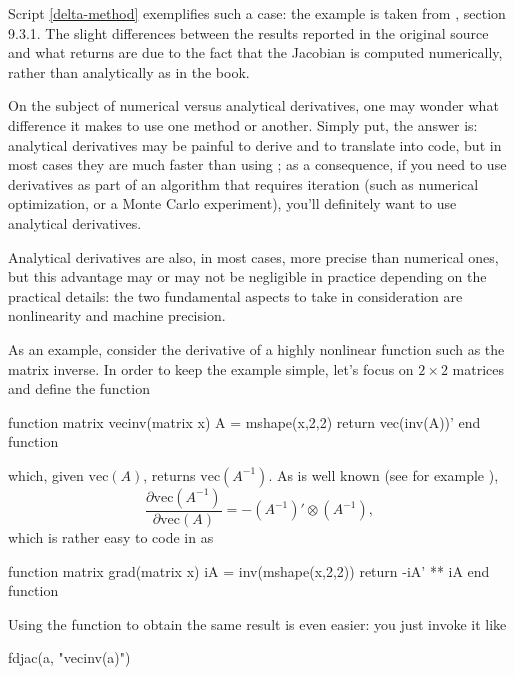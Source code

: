 Script \ref{delta-method} exemplifies such a case: the example is
taken from \cite{greene03}, section 9.3.1. The slight differences
between the results reported in the original source and what
 returns are due to the fact that the Jacobian is computed
numerically, rather than analytically as in the book.

On the subject of numerical versus analytical derivatives, one may
wonder what difference it makes to use one method or another. Simply
put, the answer is: analytical derivatives may be painful to derive
and to translate into code, but in most cases they are much faster
than using ; as a consequence, if you need to use
derivatives as part of an algorithm that requires iteration (such as
numerical optimization, or a Monte Carlo experiment), you'll
definitely want to use analytical derivatives.

Analytical derivatives are also, in most cases, more precise than
numerical ones, but this advantage may or may not be negligible in
practice depending on the practical details: the two fundamental
aspects to take in consideration are nonlinearity and machine precision.

As an example, consider the derivative of a highly nonlinear function
such as the matrix inverse. In order to keep the example simple, let's
focus on $2 \times 2$ matrices and define the function
\begin{code}
function matrix vecinv(matrix x)
    A = mshape(x,2,2)
    return vec(inv(A))'
end function
\end{code}
which, given $\mathrm{vec}(A)$, returns $\mathrm{vec}(A^{-1})$. As is
well known (see for example \cite{magneu88}),
\[
  \frac{\partial \mathrm{vec}(A^{-1})}{\partial \mathrm{vec}(A)} 
  = - (A^{-1})' \otimes (A^{-1}),
\]
which is rather easy to code in  as
\begin{code}
function matrix grad(matrix x)
    iA = inv(mshape(x,2,2))
    return -iA' ** iA
end function  
\end{code}
Using the  function to obtain the same result is even
easier: you just invoke it like
\begin{code}
fdjac(a, "vecinv(a)")  
\end{code}

